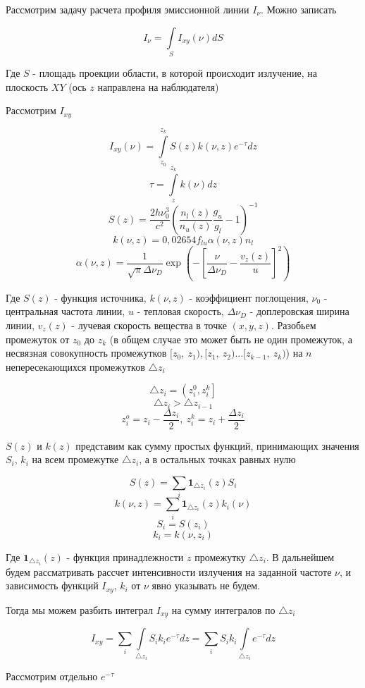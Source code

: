 \documentclass{article}
\begin{document}
Рассмотрим задачу расчета профиля эмиссионной линии $I_{\nu}$. Можно записать

$$I_{\nu} = \int \limits_{S} I_{xy}(\nu) dS$$

Где $S$ - площадь проекции области, в которой происходит излучение, на плоскость $XY$ (ось $z$ направлена на наблюдателя) 

Рассмотрим $I_{xy}$

$$I_{xy}(\nu) =  \int \limits_{z_0}^{z_k} S(z)k(\nu, z)e^{-\tau}dz$$
$$\tau = \int \limits_z^{z_k} k(\nu)dz$$
$$S(z) = \frac{2h\nu_0^3}{c^2}\left(\frac{n_l(z)}{n_u(z)} \frac{g_u}{g_l} - 1 \right)^{-1} $$
$$k(\nu, z) = 0,02654f_{lu}\alpha(\nu, z)n_l$$
$$\alpha(\nu, z) = \frac{1}{\sqrt{\pi} \Delta\nu_D} \exp\left( -\left[ \frac{\nu}{\Delta\nu_D} - \frac{v_z(z)}{u}\right]^2\right)$$

Где $S(z)$ - функция источника, $k(\nu, z)$ - коэффициент поглощения, $\nu_0$ - центральная частота линии, $u$ - тепловая скорость, $\Delta\nu_D$ - доплеровская ширина линии, $v_z(z)$ - лучевая скорость вещества в точке $(x, y, z)$. Разобьем промежуток от $z_0$ до $z_k$ (в общем случае это может быть не один промежуток, а несвязная совокупность промежутков $[z_0,~z_1),[z_1,~z_2)...[z_{k-1},~z_k)$) на $n$ непересекающихся промежутков $\triangle z_i$

$$\triangle z_i = \left( z_i^0, z_i^k \right] $$
$$\triangle z_i > \triangle z_{i-1}$$
$$ z_i^o = z_i - \frac{\Delta z_i}{2},\ z_i^k = z_i + \frac{\Delta z_i}{2}$$

$S(z)$ и $k(z)$ представим как сумму простых функций, принимающих значения $S_i$, $k_i$ на всем промежутке $\triangle z_i$, а в остальных точках равных нулю

$$S(z) = \sum \limits_i \mathbf{1}_{\triangle z_i}(z) S_i$$ 
$$k(\nu, z) = \sum \limits_i \mathbf{1}_{\triangle z_i}(z) k_i(\nu)$$
$$S_i = S(z_i)$$ 
$$k_i = k(\nu, z_i)$$

Где $\mathbf{1}_{\triangle z_i}(z)$ - функция принадлежности $z$ промежутку $\triangle z_i$. В дальнейшем будем рассматривать рассчет интенсивности излучения на заданной частоте $\nu$, и зависимость функций $I_{xy}$, $k_i$ от $\nu$ явно указывать не будем.

Тогда мы можем разбить интеграл $I_{xy}$ на сумму интегралов по $\triangle z_i$

$$I_{xy} = \sum \limits_i \int \limits_{\triangle z_i} S_i k_i e^{-\tau}dz = \sum \limits_i S_i k_i \int \limits_{\triangle z_i} e^{-\tau}dz$$

Рассмотрим отдельно $e^{-\tau}$
\end{document}

